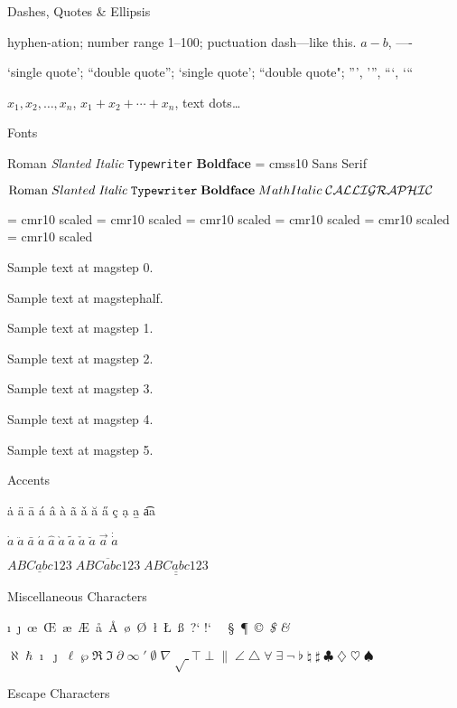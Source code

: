 \beginsection Dashes, Quotes \& Ellipsis

\indent
hyphen-ation; number range 1--100; puctuation dash---like this. $a-b$,
----

`single quote'; ``double quote''; \lq single quote\rq; ``double quote";
''', '\thinspace'', ``\thinspace`, {`}``


$x_1, x_2, \ldots, x_n$, $x_1 + x_2 + \cdots + x_n$, text dots\dots


\beginsection Fonts

\indent
{\rm Roman} {\sl Slanted} {\it Italic} {\tt Typewriter} {\bf Boldface}
\font\sf = cmss10 {\sf Sans Serif}

$
	{\rm Roman}\; {\sl Slanted}\; {\it Italic}\; {\tt Typewriter}\;
	{\bf Boldface}\; {\mit Math Italic}\; {\cal CALLIGRAPHIC}
$

\font\cmrhalf = cmr10 scaled \magstephalf
\font\cmrone = cmr10 scaled 
\font\cmrtwo = cmr10 scaled 
\font\cmrthree = cmr10 scaled 
\font\cmrfour = cmr10 scaled 
\font\cmrfive = cmr10 scaled 

\centerline{Sample text at magstep 0.}
\centerline{\cmrhalf Sample text at magstephalf.}
\centerline{\cmrone Sample text at magstep 1.}
\centerline{\cmrtwo Sample text at magstep 2.}
\centerline{\cmrthree Sample text at magstep 3.}
\centerline{\cmrfour Sample text at magstep 4.}
\centerline{\cmrfive Sample text at magstep 5.}


\beginsection Accents

\indent
\.a \"a \=a \'a \^a \`a \~a \v a \u a \H a \c c \d a \b a \t aa

$
	\dot a\; \ddot a\; \bar a\; \acute a\; \hat{a}\; \grave a\;
	\tilde{a}\; \check{a}\; \breve{a}\; \vec{a}\;
	\dot{\dot a}
$

$
	\underline{ABCabc123}\; \overline{ABCabc123}\;
	\underline{\underline{ABCabc123}}
$

\beginsection Miscellaneous Characters

\indent
\i\ \j\ \oe\ \OE\ \ae\ \AE\ \aa\ \AA\ \o\ \O\ \l\ \L\ \ss\ ?` !`
\dag\ \ddag\ \S\ \P\ \copyright\ {\it \$} {\it \&}

$
	\aleph\; \hbar\; \imath\; \jmath\; \ell\; \wp\; \Re\; \Im\;
	\partial\; \infty\; \prime\; \emptyset\; \nabla\; \surd\;
	\top\; \bot\; \|\; \angle\; \triangle\; \forall\; \exists\;
	\neg\; \flat\; \natural\; \sharp\; \clubsuit\; \diamondsuit\;
	\heartsuit\; \spadesuit
$

\beginsection Escape Characters

